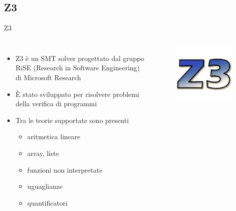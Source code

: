 \documentclass[]{beamer}
\begin{document}
\subsection{Z3}
\begin{frame}{Z3}
\begin{columns}[onlytextwidth]
\begin{itemize}
    \item Z3 è un SMT solver progettato dal gruppo RiSE (Research in Software Engineering) di Microsoft Research
    \item È stato sviluppato per risolvere problemi della verifica di programmi
    \item Tra le teorie supportate sono presenti \begin{itemize}
        \item aritmetica lineare
        \item array, liste
        \item funzioni non interpretate
        \item uguaglianze
        \item quantificatori
    \end{itemize}
\end{itemize}
\begin{figure}
    \centering
    \includegraphics[scale=0.25]{assets/img/z3.jpg}
\end{figure}
\end{columns}
\end{frame}
\end{document}
